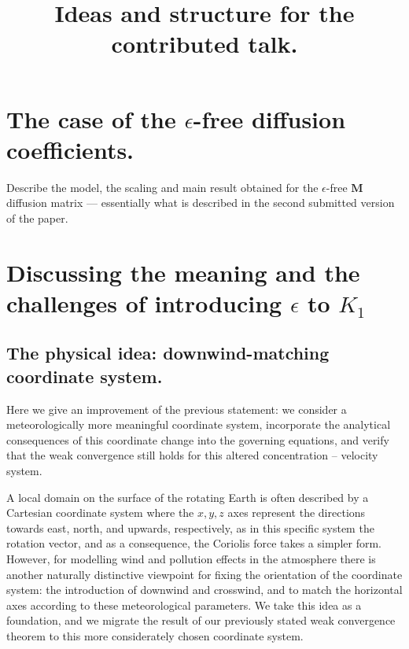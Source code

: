 \documentclass[11pt]{article}
\title{Ideas and structure for the contributed talk.}
\date{}
\begin{document}
\maketitle

\section{The case of the $\epsilon$-free diffusion coefficients.}

Describe the model, the scaling and main result obtained for the $\epsilon$-free $\mathbf{M}$ diffusion matrix --- essentially what is described in the second submitted version of the paper.
  
\section{Discussing the meaning and the challenges of introducing $\epsilon$ to $K_1$}

\subsection{The physical idea: downwind-matching coordinate system.}
  
  
  Here we give an improvement of the previous statement: we consider a meteorologically more meaningful coordinate system, incorporate the analytical consequences of this coordinate change into the governing equations, and verify that the weak convergence still holds for this altered concentration -- velocity system.
  
  A local domain on the surface of the rotating Earth is often described by a Cartesian coordinate system where the $x, y, z$ axes represent the directions towards east, north, and upwards, respectively, as in this specific system the rotation vector, and as a consequence, the Coriolis force takes a simpler form. However, for modelling wind and pollution effects in the atmosphere there is another naturally distinctive viewpoint for fixing the orientation of the coordinate system: the introduction of downwind and crosswind, and to match the horizontal axes according to these meteorological parameters. We take this idea as a foundation, and we migrate the result of our previously stated weak convergence theorem to this more considerately chosen coordinate system.
\end{document}
